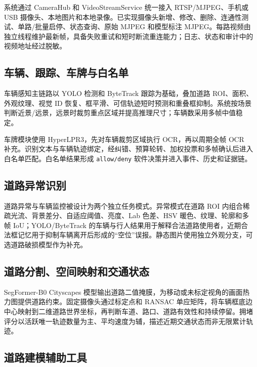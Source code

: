 系统通过 CameraHub 和 VideoStreamService 统一接入 RTSP/MJPEG、手机或 USB 摄像头、本地图片和本地录像。已实现摄像头新增、修改、删除、连通性测试、单路/批量启停、状态查询、原始 MJPEG 和模型标注 MJPEG。每路视频由独立线程维护最新帧，具备失败重试和短时断流重连能力；日志、状态和审计中的视频地址经过脱敏。

\subsection{车辆、跟踪、车牌与白名单}\label{summary-ux8f66ux8f86ux8ddfux8e2aux8f66ux724cux4e0eux767dux540dux5355}

车辆感知主链路以 YOLO 检测和 ByteTrack 跟踪为基础，叠加道路 ROI、面积、外观纹理、视觉 ID 恢复、框平滑、可信轨迹短时预测和重叠框抑制。系统按场景判断近景/远景，远景时裁剪重点区域并提高推理尺寸；车辆数采用多帧中值稳定。

车牌模块使用 HyperLPR3，先对车辆裁剪区域执行 OCR，再以周期全帧 OCR 补充。识别文本与车辆轨迹绑定，经纠错、预算轮转、加权投票和多帧确认后进入白名单匹配。白名单结果形成 \texttt{allow/\allowbreak{}deny} 软件决策并进入事件、历史和证据链。

\subsection{道路异常识别}\label{summary-ux9053ux8defux5f02ux5e38ux8bc6ux522b}

道路异常与车辆监控被设计为两个独立任务模式。异常模式在道路 ROI 内组合稀疏光流、背景差分、自适应阈值、亮度、Lab 色差、HSV 暖色、纹理、轮廓和多帧 IoU；YOLO/ByteTrack 的车辆与行人结果用于解释合法道路使用者，近期合法框记忆用于抑制车辆离开后形成的``空位''误报。静态图片使用独立外观分支，可选道路破损模型作为补充。

\subsection{道路分割、空间映射和交通状态}\label{summary-ux9053ux8defux5206ux5272ux7a7aux95f4ux6620ux5c04ux548cux4ea4ux901aux72b6ux6001}

SegFormer-B0 Cityscapes 模型输出道路二值掩膜，为移动或未标定视角的画面热力图提供道路约束。固定摄像头通过标定点和 RANSAC 单应矩阵，将车辆框底边中心映射到二维道路世界坐标，再判断车道、路口、道路有效性和持续停留。拥堵评分以活跃唯一轨迹数量为主、平均速度为辅，描述近期交通状态而非无限累计轨迹。

\subsection{道路建模辅助工具}\label{summary-ux9053ux8defux5efaux6a21ux8f85ux52a9ux5de5ux5177}

